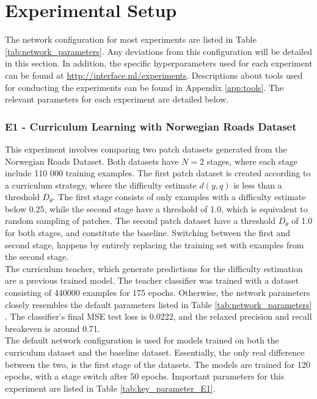 \section{Experimental Setup}
\label{sec:experimentalSetup}
The network configuration for most experiments are listed in Table \ref{tab:network_parameters}. Any deviations from this configuration will be detailed in this section. In addition, the specific hyperparameters used for each experiment can be found at \url{http://interface.ml/experiments}. Descriptions about tools used for conducting the experiments can be found in Appendix \ref{app:tools}. The relevant parameters for each experiment are detailed below.\\ 

\subsubsection{E1 - Curriculum Learning with Norwegian Roads Dataset}
This experiment involves comparing two patch datasets generated from the Norwegian Roads Dataset. Both datasets have $N=2$ stages, where each stage include 110 000 training examples. The first patch dataset is created according to a curriculum strategy, where the difficulty estimate $d(y, q)$ is less than a threshold $D_\theta$. The first stage consists of only examples with a difficulty estimate below 0.25,  while the second stage have a threshold of 1.0, which is equivalent to random sampling of patches. The second patch dataset have a threshold $D_\theta$ of 1.0 for both stages, and constitute the baseline. Switching between the first and second stage, happens by entirely replacing the training set with examples from the second stage.\\

The curriculum teacher, which generate predictions for the difficulty estimation are a previous trained model. The teacher classifier was trained with a dataset consisting of 440000 examples for 175 epochs. Otherwise, the network parameters closely resembles the default parameters listed in Table \ref{tab:network_parameters} . The classifier's final \ac{MSE} test loss is 0.0222, and the relaxed precision and recall breakeven is around 0.71. \\

The default network configuration is used for models trained on both the curriculum dataset and the baseline dataset. Essentially, the only real difference between the two, is the first stage of the datasets. The models are trained for 120 epochs, with a stage switch after 50 epochs. Important parameters for this experiment are listed in Table \ref{tab:key_parameter_E1}.\\

